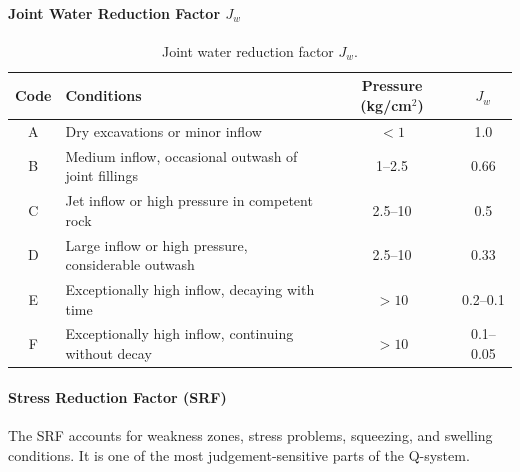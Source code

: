 \paragraph{Joint Water Reduction Factor \(J_w\)}

\begin{table}[H]
\centering
\small
\begin{tabularx}{\textwidth}{c Y c c}
\toprule
\textbf{Code} & \textbf{Conditions} & \textbf{Pressure (kg/cm\(^2\))} & \textbf{\(J_w\)} \\
\midrule
A & Dry excavations or minor inflow & \(<1\) & 1.0 \\
B & Medium inflow, occasional outwash of joint fillings & 1--2.5 & 0.66 \\
C & Jet inflow or high pressure in competent rock & 2.5--10 & 0.5 \\
D & Large inflow or high pressure, considerable outwash & 2.5--10 & 0.33 \\
E & Exceptionally high inflow, decaying with time & \(>10\) & 0.2--0.1 \\
F & Exceptionally high inflow, continuing without decay & \(>10\) & 0.1--0.05 \\
\bottomrule
\end{tabularx}
\caption{Joint water reduction factor \(J_w\).}
\label{tab:jw}
\end{table}

\paragraph{Stress Reduction Factor (SRF)}
\label{sec:srf}

The SRF accounts for weakness zones, stress problems, squeezing, and swelling conditions.
It is one of the most judgement-sensitive parts of the Q-system.

